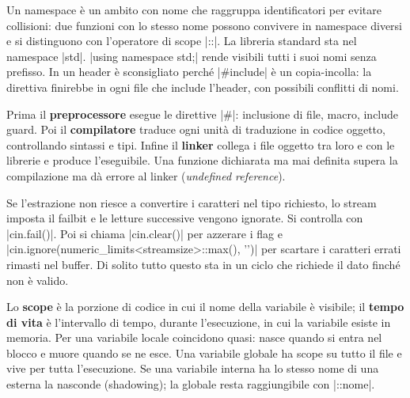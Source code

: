 \begin{orale}
Un namespace è un ambito con nome che raggruppa identificatori per evitare
collisioni: due funzioni con lo stesso nome possono convivere in namespace
diversi e si distinguono con l'operatore di scope \cc|::|. La libreria standard
sta nel namespace \cc|std|. \cc|using namespace std;| rende visibili tutti i suoi
nomi senza prefisso. In un header è sconsigliato perché \cc|#include| è un
copia-incolla: la direttiva finirebbe in ogni file che include l'header, con
possibili conflitti di nomi.
\end{orale}

\begin{orale}
Prima il \textbf{preprocessore} esegue le direttive \cc|#|: inclusione di file,
macro, include guard. Poi il \textbf{compilatore} traduce ogni unità di
traduzione in codice oggetto, controllando sintassi e tipi. Infine il
\textbf{linker} collega i file oggetto tra loro e con le librerie e produce
l'eseguibile. Una funzione dichiarata ma mai definita supera la compilazione ma
dà errore al linker (\emph{undefined reference}).
\end{orale}

\begin{orale}
Se l'estrazione non riesce a convertire i caratteri nel tipo richiesto, lo
stream imposta il failbit e le letture successive vengono ignorate. Si controlla
con \cc|cin.fail()|. Poi si chiama \cc|cin.clear()| per azzerare i flag e
\cc|cin.ignore(numeric_limits<streamsize>::max(), '\n')| per scartare i caratteri
errati rimasti nel buffer. Di solito tutto questo sta in un ciclo che richiede il
dato finché non è valido.
\end{orale}

\begin{orale}
Lo \textbf{scope} è la porzione di codice in cui il nome della variabile è
visibile; il \textbf{tempo di vita} è l'intervallo di tempo, durante
l'esecuzione, in cui la variabile esiste in memoria. Per una variabile locale
coincidono quasi: nasce quando si entra nel blocco e muore quando se ne esce.
Una variabile globale ha scope su tutto il file e vive per tutta l'esecuzione.
Se una variabile interna ha lo stesso nome di una esterna la nasconde
(shadowing); la globale resta raggiungibile con \cc|::nome|.
\end{orale}

